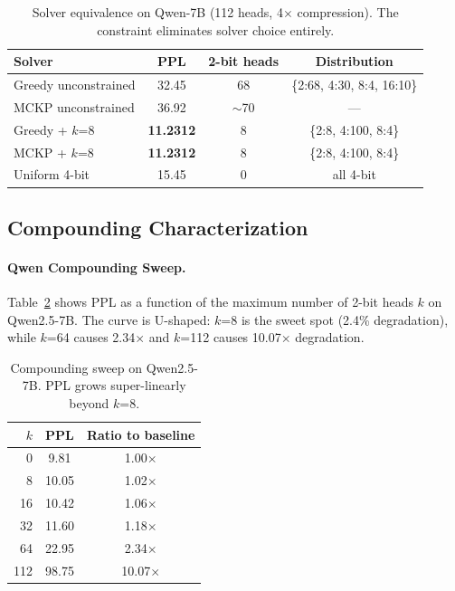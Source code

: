 \documentclass[11pt,a4paper]{article}
\begin{document}
\begin{table}[t]
\centering
\small
\caption{Solver equivalence on Qwen-7B (112 heads, 4$\times$ compression). The constraint eliminates solver choice entirely.}
\label{tab:solver_equiv}
\begin{tabular}{@{}lccc@{}}
\toprule
\textbf{Solver} & \textbf{PPL} & \textbf{2-bit heads} & \textbf{Distribution} \\
\midrule
Greedy unconstrained & 32.45 & 68 & \{2:68, 4:30, 8:4, 16:10\} \\
MCKP unconstrained & 36.92 & $\sim$70 & --- \\
\midrule
Greedy + $k$=8 & \textbf{11.2312} & 8 & \{2:8, 4:100, 8:4\} \\
MCKP + $k$=8 & \textbf{11.2312} & 8 & \{2:8, 4:100, 8:4\} \\
\midrule
Uniform 4-bit & 15.45 & 0 & all 4-bit \\
\bottomrule
\end{tabular}
\end{table}


\subsection{Compounding Characterization}
\label{sec:compounding}

\paragraph{Qwen Compounding Sweep.}
Table~\ref{tab:compounding} shows PPL as a function of the maximum number of 2-bit heads $k$ on Qwen2.5-7B.
The curve is U-shaped: $k$=8 is the sweet spot (2.4\% degradation), while $k$=64 causes 2.34$\times$ and $k$=112 causes 10.07$\times$ degradation.

\begin{table}[t]
\centering
\small
\caption{Compounding sweep on Qwen2.5-7B. PPL grows super-linearly beyond $k$=8.}
\label{tab:compounding}
\begin{tabular}{@{}rcc@{}}
\toprule
$k$ & PPL & Ratio to baseline \\
\midrule
0 & 9.81 & 1.00$\times$ \\
8 & 10.05 & 1.02$\times$ \\
16 & 10.42 & 1.06$\times$ \\
32 & 11.60 & 1.18$\times$ \\
64 & 22.95 & 2.34$\times$ \\
112 & 98.75 & 10.07$\times$ \\
\bottomrule
\end{tabular}
\end{table}
\end{document}
